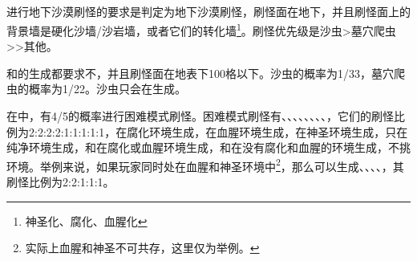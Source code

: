 \subsection{}
进行地下沙漠刷怪的要求是判定为地下沙漠刷怪，刷怪面在地下，并且刷怪面上的背景墙是硬化沙墙/沙岩墙，或者它们的转化墙\footnote{神圣化、腐化、血腥化}。刷怪优先级是沙虫>墓穴爬虫>>其他。

和的生成都要求不，并且刷怪面在地表下100格以下。沙虫的概率为1/33，墓穴爬虫的概率为1/22。沙虫只会在生成。

在中，有4/5的概率进行困难模式刷怪。困难模式刷怪有、、、、、、、、，它们的刷怪比例为2:2:2:2:1:1:1:1:1，在腐化环境生成，在血腥环境生成，在神圣环境生成，只在纯净环境生成，和在腐化或血腥环境生成，和在没有腐化和血腥的环境生成，不挑环境。举例来说，如果玩家同时处在血腥和神圣环境中\footnote{实际上血腥和神圣不可共存，这里仅为举例。}，那么可以生成、、、、，其刷怪比例为2:2:1:1:1。

